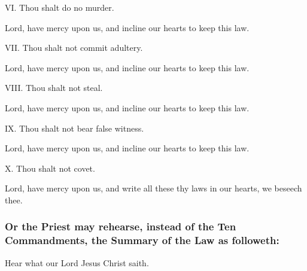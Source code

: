 VI. Thou shalt do no murder.

\R Lord, have mercy upon us, and incline our hearts to keep this law.

VII. Thou shalt not commit adultery.
    
\R Lord, have mercy upon us, and incline our hearts to keep this law.

VIII. Thou shalt not steal.

\R Lord, have mercy upon us, and incline our hearts to keep this law.

IX. Thou shalt not bear false witness. %

\R Lord, have mercy upon us, and incline our hearts to keep this law.

X. Thou shalt not covet. %


\R Lord, have mercy upon us, and write all these thy laws in our hearts, we beseech thee.

\medskip

\subsubsection{Or the Priest may rehearse, instead of the Ten Commandments, the Summary of the Law as followeth:}

\centerline{Hear what our Lord Jesus Christ saith.}
 


